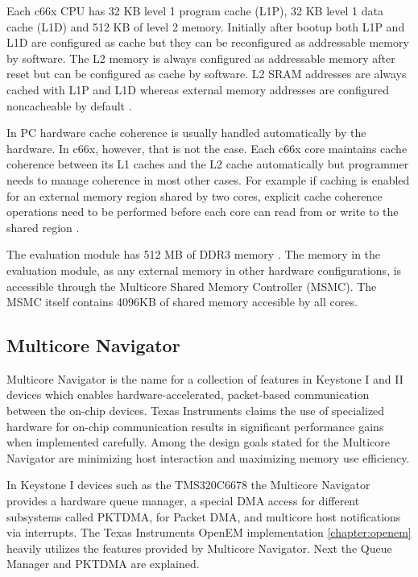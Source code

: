 Each c66x CPU has 32 KB level 1 program cache (L1P), 32 KB level 1 data cache (L1D) and 512 KB of level 2 memory. Initially after bootup both L1P and L1D are configured as cache but they can be reconfigured as addressable memory by software. The L2 memory is always configured as addressable memory after reset but can be configured as cache by software. \cite{tmsdatasheet} L2 SRAM addresses are always cached with L1P and L1D whereas external memory addresses are configured noncacheable by default \cite{cacheguide}.

In PC hardware cache coherence is usually handled automatically by the hardware. In c66x, however, that is not the case. Each c66x core maintains cache coherence between its L1 caches and the L2 cache automatically but programmer needs to manage coherence in most other cases. For example if caching is enabled for an external memory region shared by two cores, explicit cache coherence operations need to be performed before each core can read from or write to the shared region \cite{cacheguide}.

The evaluation module has 512 MB of DDR3 memory \cite{evmref}. The memory in the evaluation module, as any external memory in other hardware configurations, is accessible through the Multicore Shared Memory Controller (MSMC). The MSMC itself contains 4096KB of shared memory accesible by all cores.

\subsection{Multicore Navigator}
\label{subsec:multicorenav}


Multicore Navigator is the name for a collection of features in Keystone I and II devices which enables hardware-accelerated, packet-based communication between the on-chip devices. Texas Instruments claims the use of specialized hardware for on-chip communication results in significant performance gains when implemented carefully. Among the design goals stated for the Multicore Navigator are minimizing host interaction and maximizing memory use efficiency. \cite{navigator}

In Keystone I devices such as the TMS320C6678 the Multicore Navigator provides a hardware queue manager, a special DMA access for different subsystems called PKTDMA, for Packet DMA, and multicore host notifications via interrupts. \cite{navigator} The Texas Instruments OpenEM implementation \ref{chapter:openem} heavily utilizes the features provided by Multicore Navigator. Next the Queue Manager and PKTDMA are explained.

